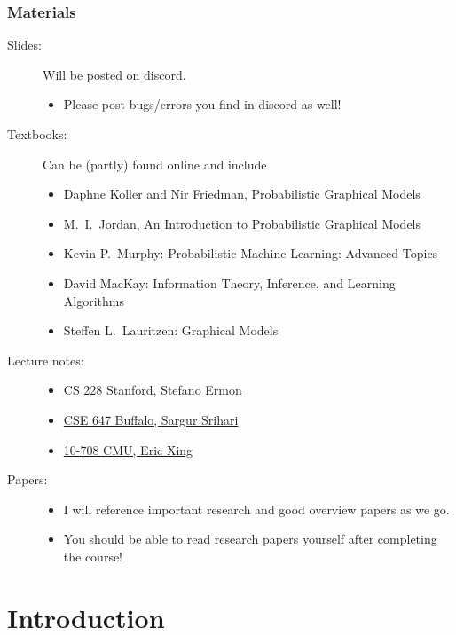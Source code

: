 \begin{frame}
    \frametitle{Materials}
\begin{description}
    \item[Slides:] Will be posted on discord.
    \begin{itemize}
    \item Please post bugs/errors you find in discord as well!
    \end{itemize}
\item[Textbooks:] Can be (partly) found online and include
\begin{itemize}
\item Daphne Koller and Nir Friedman, Probabilistic Graphical Models
\item M.\ I.\ Jordan, An Introduction to Probabilistic Graphical Models
\item Kevin P.\ Murphy: Probabilistic Machine Learning: Advanced Topics
\item David MacKay: Information Theory, Inference, and Learning Algorithms
\item Steffen L.\ Lauritzen: Graphical Models
\end{itemize}
\item[Lecture notes:]
\begin{itemize}
\item \href{https://ermongroup.github.io/cs228/}{CS 228 Stanford, Stefano Ermon}
\item \href{https://cedar.buffalo.edu/~srihari/CSE674/}{CSE 647 Buffalo, Sargur Srihari}
\item \href{https://cedar.buffalo.edu/~srihari/CSE674/}{10-708 CMU, Eric Xing}
\end{itemize}
\item[Papers:]
\begin{itemize}
\item I will reference important research and good overview papers as we go.
\item You should be able to read research papers yourself after completing the course!
\end{itemize}
\end{description}
\end{frame}

\section{Introduction}

